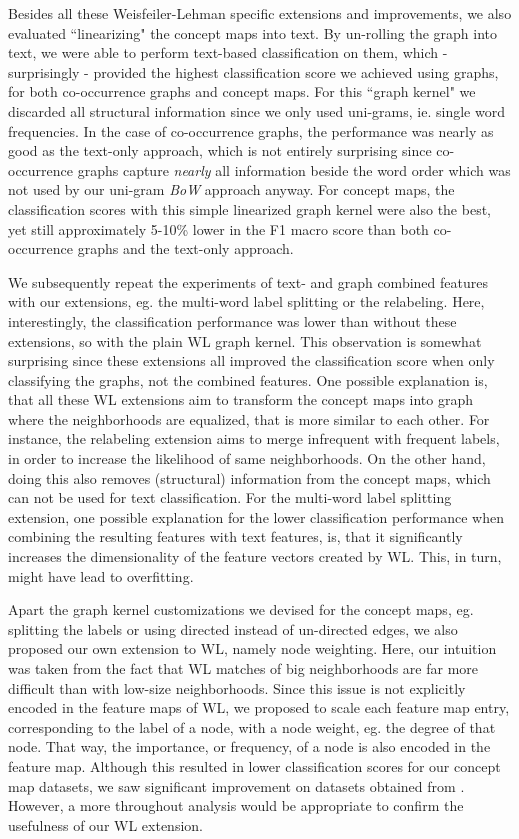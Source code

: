 Besides all these Weisfeiler-Lehman specific extensions and improvements, we also evaluated ``linearizing" the concept maps into text.
By un-rolling the graph into text, we were able to perform text-based classification on them, which - surprisingly - provided the highest classification score we achieved using graphs, for both co-occurrence graphs and concept maps.
For this ``graph kernel" we discarded all structural information since we only used uni-grams, ie. single word frequencies.
In the case of co-occurrence graphs, the performance was nearly as good as the text-only approach, which is not entirely surprising since co-occurrence graphs capture \textit{nearly} all information beside the word order which was not used by our uni-gram \textit{BoW} approach anyway.
For concept maps, the classification scores with this simple linearized graph kernel were also the best, yet still approximately 5-10\% lower in the F1 macro score than both co-occurrence graphs and the text-only approach.

We subsequently repeat the experiments of text- and graph combined features with our extensions, eg. the multi-word label splitting or the relabeling.
Here, interestingly, the classification performance was lower than without these extensions, so with the plain WL graph kernel.
This observation is somewhat surprising since these extensions all improved the classification score when only classifying the graphs, not the combined features.
One possible explanation is, that all these WL extensions aim to transform the concept maps into graph where the neighborhoods are equalized, that is more similar to each other.
For instance, the relabeling extension aims to merge infrequent with frequent labels, in order to increase the likelihood of same neighborhoods.
On the other hand, doing this also removes (structural) information from the concept maps, which can not be used for text classification.
For the multi-word label splitting extension, one possible explanation for the lower classification performance when combining the resulting features with text features, is, that it significantly increases the dimensionality of the feature vectors created by WL.
This, in turn, might have lead to overfitting.

Apart the graph kernel customizations we devised for the concept maps, eg. splitting the labels or using directed instead of un-directed edges, we also proposed our own extension to WL, namely node weighting.
Here, our intuition was taken from the fact that WL matches of big neighborhoods are far more difficult than with low-size neighborhoods.
Since this issue is not explicitly encoded in the feature maps of WL, we proposed to scale each feature map entry, corresponding to the label of a node, with a node weight, eg. the degree of that node.
That way, the importance, or frequency, of a node is also encoded in the feature map.
Although this resulted in lower classification scores for our concept map datasets, we saw significant improvement on datasets obtained from \cite{Kersting2016}.
However, a more throughout analysis would be appropriate to confirm the usefulness of our WL extension.

